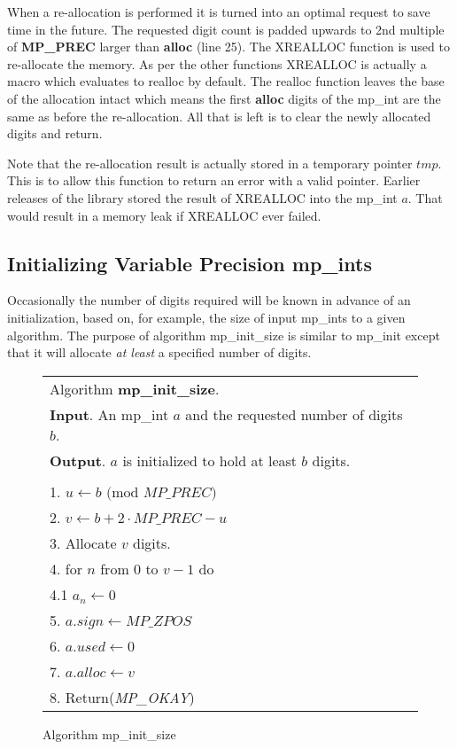 \documentclass[b5paper]{book}
\begin{document}
When a re-allocation is performed it is turned into an optimal request to save time in the future.  The requested digit count is
padded upwards to 2nd multiple of \textbf{MP\_PREC} larger than \textbf{alloc} (line 25).  The XREALLOC function is used
to re-allocate the memory.  As per the other functions XREALLOC is actually a macro which evaluates to realloc by default.  The realloc
function leaves the base of the allocation intact which means the first \textbf{alloc} digits of the mp\_int are the same as before
the re-allocation.  All	that is left is to clear the newly allocated digits and return.

Note that the re-allocation result is actually stored in a temporary pointer $tmp$.  This is to allow this function to return
an error with a valid pointer.  Earlier releases of the library stored the result of XREALLOC into the mp\_int $a$.  That would
result in a memory leak if XREALLOC ever failed.  

\subsection{Initializing Variable Precision mp\_ints}
Occasionally the number of digits required will be known in advance of an initialization, based on, for example, the size 
of input mp\_ints to a given algorithm.  The purpose of algorithm mp\_init\_size is similar to mp\_init except that it 
will allocate \textit{at least} a specified number of digits.  

\begin{figure}[here]
\begin{small}
\begin{center}
\begin{tabular}{l}
\hline Algorithm \textbf{mp\_init\_size}. \\
\textbf{Input}.   An mp\_int $a$ and the requested number of digits $b$. \\
\textbf{Output}.  $a$ is initialized to hold at least $b$ digits. \\
\hline \\
1.  $u \leftarrow b \mbox{ (mod }MP\_PREC\mbox{)}$ \\
2.  $v \leftarrow b + 2 \cdot MP\_PREC - u$ \\
3.  Allocate $v$ digits. \\
4.  for $n$ from $0$ to $v - 1$ do \\
\hspace{3mm}4.1  $a_n \leftarrow 0$ \\
5.  $a.sign \leftarrow MP\_ZPOS$\\
6.  $a.used \leftarrow 0$\\
7.  $a.alloc \leftarrow v$\\
8.  Return(\textit{MP\_OKAY})\\
\hline
\end{tabular}
\end{center}
\end{small}
\caption{Algorithm mp\_init\_size}
\end{figure}
\end{document}
